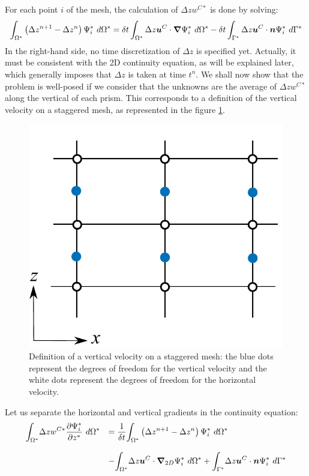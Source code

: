For each point $i$ of the mesh, the calculation of $\Delta zw^{C\ast}$ is done by solving:%
\begin{equation}
\int_{\Omega^{\ast}}\left(\Delta z^{n+1}-\Delta z^{n}\right)\Psi_{i}^{\ast}~d\Omega^{\ast}=
\delta t\int_{\Omega^{\ast}}\Delta z\bm{u}^C\cdot\bm{\nabla}\Psi_{i}^{\ast}~d\Omega^{\ast}
-\delta t\int_{\Gamma^{\ast}}\Delta z\bm{u}^C\cdot\bm{n}\Psi_{i}^{\ast}~d\Gamma^{\ast}
\end{equation}
In the right-hand side, no time discretization of $\Delta z$ is specified yet.
Actually, it must be consistent with the 2D continuity equation, as will be
explained later, which generally imposes that $\Delta z$ is taken at time
$t^{n}$. We shall now show that the problem is well-posed if we consider that the
unknowns are the average of $\Delta zw^{C\ast}$ along the vertical of each prism.
This corresponds to a definition of the vertical velocity on a staggered mesh,
as represented in the figure \ref{vitesse verticale}.
\begin{figure}[tbh]%
\centering
\includegraphics[scale=0.5]{graphics/fluxes.pdf}%
\caption{Definition of a vertical velocity on a staggered mesh: the blue dots represent
the degrees of freedom for the vertical velocity and the white dots represent the degrees
of freedom for the horizontal velocity.}%
\label{vitesse verticale}%
\end{figure}
Let us separate the horizontal and vertical gradients in the continuity
equation:
\begin{equation}
\begin{array}{ll}
\displaystyle{\int_{\Omega^{\ast}}}\Delta zw^{C\ast}\dfrac{\partial\Psi_{i}^{\ast}}{\partial
z^{\ast}}~d\Omega^{\ast} & =\dfrac{1}{\delta t}\displaystyle{\int_{\Omega^{\ast}}}\left(  \Delta
z^{n+1}-\Delta z^{n}\right)  \Psi_{i}^{\ast}~d\Omega^{\ast} \bigskip\\
& -\displaystyle{\int_{\Omega^{\ast}}}\Delta z\vec{u}^C\cdot\Grad_{2D}\Psi_{i}^{\ast}~d\Omega^{\ast}
+\displaystyle{\int_{\Gamma^{\ast}}}\Delta z\vec{u}^C\cdot\vec{n}\Psi_{i}^{\ast}~d\Gamma^{\ast}
\end{array}\label{CONT3D}
\end{equation}


